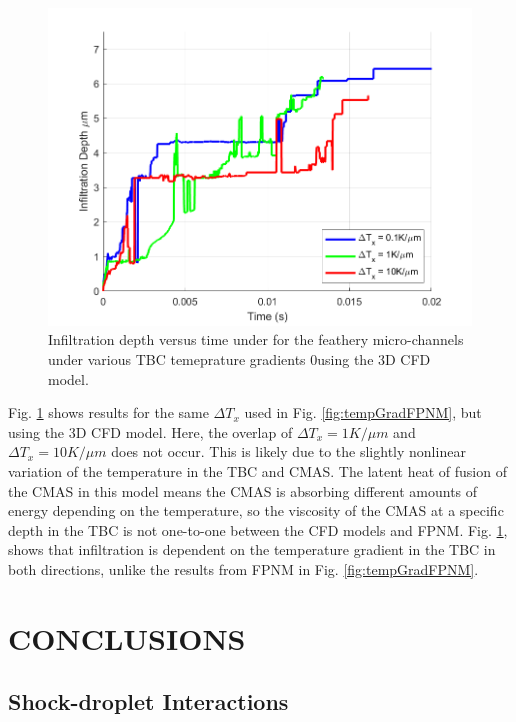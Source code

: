 \documentclass{UCF_ETD}
\begin{document}
\begin{figure}[htp!]
    \centering
    \includegraphics[width=\linewidth]{Figures/tempGradStudyCFD.png}
    \caption{Infiltration depth versus time under for the feathery micro-channels under various TBC temeprature gradients 0using the 3D CFD model.}
    \label{fig:tempGradCFD}
\end{figure}

Fig. \ref{fig:tempGradCFD} shows results for the same $\Delta T_{x}$ used in Fig. \ref{fig:tempGradFPNM}, but using the 3D CFD model. Here, the overlap of $\Delta T_{x} = 1 K/\mu m$ and $\Delta T_{x} = 10 K/\mu m$ does not occur. This is likely due to the slightly nonlinear variation of the temperature in the TBC and CMAS. The latent heat of fusion of the CMAS in this model means the CMAS is absorbing different amounts of energy depending on the temperature, so the viscosity of the CMAS at a specific depth in the TBC is not one-to-one between the CFD models and FPNM.  Fig. \ref{fig:tempGradCFD}, shows that infiltration is dependent on the temperature gradient in the TBC in both directions, unlike the results from FPNM in Fig. \ref{fig:tempGradFPNM}. 


\chapter{CONCLUSIONS}
\section{Shock-droplet Interactions}
\label{sec:shockdrop_conc}
\end{document}
